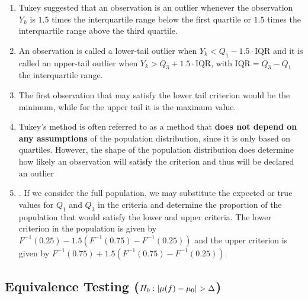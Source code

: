 \begin{enumerate}
    \item Tukey suggested that an observation is an outlier whenever the observation $Y_k$ is $1.5$ times the interquartile range below the first quartile or $1.5$ times the interquartile range above the third quartile. 
    \hfill \cite{statistics/book/Statistics-for-Data-Scientists/Maurits-Kaptein}
    
    \item An observation is called a lower-tail outlier when $Y_k < Q_1 - 1.5\cdot\text{IQR}$ and it is called an upper-tail outlier when $Y_k > Q_3 + 1.5\cdot \text{IQR}$, with $\text{IQR} = Q_3 - Q_1$ the interquartile range. 
    \hfill \cite{statistics/book/Statistics-for-Data-Scientists/Maurits-Kaptein}
    
    \item The first observation that may satisfy the lower tail criterion would be the minimum, while for the upper tail it is the maximum value.
    \hfill \cite{statistics/book/Statistics-for-Data-Scientists/Maurits-Kaptein}

    \item Tukey’s method is often referred to as a method that \textbf{does not depend on any assumptions} of the population distribution, since it is only based on quartiles. 
    However, the shape of the population distribution does determine how likely an observation will satisfy the criterion and thus will be declared an outlier
    \hfill \cite{statistics/book/Statistics-for-Data-Scientists/Maurits-Kaptein}

    \item . If we consider the full population, we may substitute the expected or true values for $Q_1$ and $Q_3$ in the criteria and determine the proportion of the population that would satisfy the lower and upper criteria. 
    The lower criterion in the population is given by $F^{-1}(0.25) - 1.5(F^{-1}(0.75) - F^{-1}(0.25))$ and the upper criterion is given by $F^{-1}(0.75) + 1.5(F^{-1}(0.75) - F^{-1}(0.25))$.
    \hfill \cite{statistics/book/Statistics-for-Data-Scientists/Maurits-Kaptein}

\end{enumerate}






\subsection{Equivalence Testing ($H_0 : \left| \mu( f ) - \mu_0 \right| > \Delta$)}


